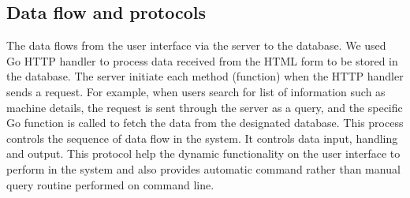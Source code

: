 \subsection{Data flow and  protocols}
The data flows from the user interface via the server to the database. We used Go HTTP handler to process data received from the HTML form to be stored in the database. The server initiate each method (function) when the HTTP handler sends a request. For example, when users search for list of information such as machine details, the request is sent through the server as a query, and the specific Go function is called to fetch the data from the designated database. This process controls the sequence of data flow in the system. It controls data input, handling and output. This protocol help the dynamic functionality on the user interface to perform in the system and also provides automatic command rather than manual query routine performed on command line. 

